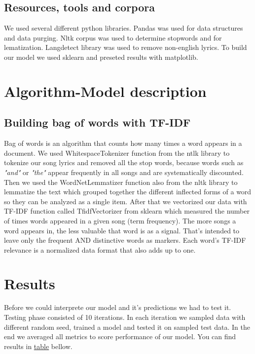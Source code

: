 \documentclass[a4paper,11pt]{article}
\begin{document}
\subsection{Resources, tools and corpora}

We used several different python libraries. Pandas was used for data structures and data purging. Nltk corpus was used to determine stopwords and for lematization. Langdetect library was used to remove non-english lyrics. To build our model we used sklearn and preseted results with matplotlib.

\section{Algorithm-Model description}


\subsection{Building bag of words with TF-IDF}
Bag of words is an algorithm that counts how many times a word appears in a document. We used WhitespaceTokenizer function from the ntlk library to tokenize our song lyrics and removed all the stop words, because words such as \textit{"and"} or \textit{"the"} appear frequently in all songs and are systematically discounted. Then we used the WordNetLemmatizer function also from the nltk library to lemmatize the text which grouped together the different inflected forms of a word so they can be analyzed as a single item. After that we vectorized our data with TF-IDF function called TfidfVectorizer from sklearn which measured the number of times words appeared in a given song (term frequency). The more songs a word appears in, the less valuable that word is as a signal. That’s intended to leave only the frequent AND distinctive words as markers. Each word’s TF-IDF relevance is a normalized data format that also adds up to one.


\section{Results}

Before we could interprete our model and it's predictions we had to test it. Testing phase consisted of 10 iterations. In each iteration we sampled data with different random seed, trained a model and tested it on sampled test data. In the end we averaged all metrics to score performance of our model. You can find results in \hyperref[label-model-score]{table} bellow.
\end{document}
